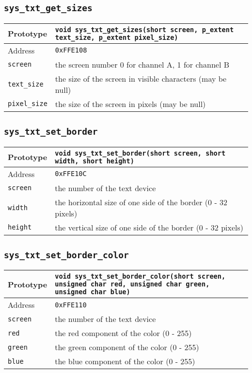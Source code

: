 \subsection*{\texttt{sys\_txt\_get\_sizes}}
\begin{tabular}{|l||l|} \hline
Prototype & \lstinline!void sys_txt_get_sizes(short screen, p_extent text_size, p_extent pixel_size)! \\ \hline
Address & \texttt{0xFFE108} \\ \hline
\lstinline!screen! & the screen number 0 for channel A, 1 for channel B \\ \hline
\lstinline!text_size! & the size of the screen in visible characters (may be null) \\ \hline
\lstinline!pixel_size! & the size of the screen in pixels (may be null) \\ \hline
\end{tabular}

\subsection*{\texttt{sys\_txt\_set\_border}}
\begin{tabular}{|l||l|} \hline
Prototype & \lstinline!void sys_txt_set_border(short screen, short width, short height)! \\ \hline
Address & \texttt{0xFFE10C} \\ \hline
\lstinline!screen! & the number of the text device \\ \hline
\lstinline!width! & the horizontal size of one side of the border (0 - 32 pixels) \\ \hline
\lstinline!height! & the vertical size of one side of the border (0 - 32 pixels) \\ \hline
\end{tabular}

\subsection*{\texttt{sys\_txt\_set\_border\_color}}
\begin{tabular}{|l||l|} \hline
Prototype & \lstinline!void sys_txt_set_border_color(short screen, unsigned char red, unsigned char green, unsigned char blue)! \\ \hline
Address & \texttt{0xFFE110} \\ \hline
\lstinline!screen! & the number of the text device \\ \hline
\lstinline!red! & the red component of the color (0 - 255) \\ \hline
\lstinline!green! & the green component of the color (0 - 255) \\ \hline
\lstinline!blue! & the blue component of the color (0 - 255) \\ \hline
\end{tabular}

